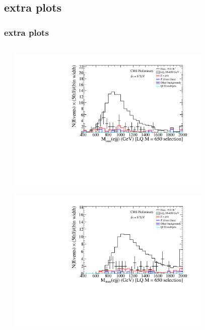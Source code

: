 \documentclass[bigger]{beamer}
\begin{document}
\subsection{\eejj extra plots}
\label{sec-1-10}
\begin{frame}
\frametitle{\eejj extra plots}
\label{sec-1-10-1}
\begin{columns} %
\label{sec-1-10-1-1}
\begin{column}{0.475\textwidth}
\label{sec-1-10-1-1-1}
\label{sec-1-10-1-1-2}

\includegraphics[width=0.8\textwidth]{fig/ee/extra/MejjMin_LQ650_eejj.pdf}
\label{sec-1-10-1-1-3}

\includegraphics[width=0.8\textwidth]{fig/ee/extra/MejjMax_LQ650_eejj.pdf}
\end{column}
\begin{column}{0.475\textwidth}
\label{sec-1-10-1-1-4}
\label{sec-1-10-1-1-5}


\end{column}
\end{columns}
\end{frame}
\end{document}
